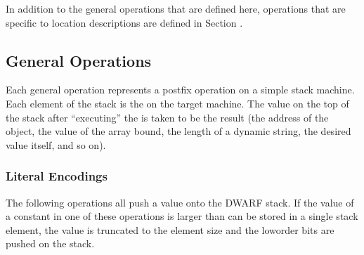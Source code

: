 In addition to the
general operations that are defined here, operations that are
specific to location descriptions are defined in 
Section .

\subsection{General Operations}
\label{chap:generaloperations}
Each general operation represents a postfix operation on
a simple stack machine. Each element of the stack is the
 on the target machine. 
The value on the
top of the stack after ``executing'' the 
is 
taken to be the result (the address of the object, the
value of the array bound, the length of a dynamic string,
the desired value itself, and so on).

\subsubsection{Literal Encodings}
\label{chap:literalencodings}
The 
following operations all push a value onto the DWARF
stack. 
If the value of a constant in one of these operations
is larger than can be stored in a single stack element, the
value is truncated to the element size and the low\dash order bits
are pushed on the stack.


